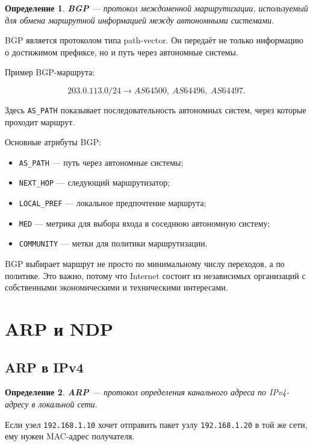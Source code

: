 \documentclass[12pt,a4paper]{article}
\newtheorem{definition}{Определение}
\begin{document}
\begin{definition}
\textbf{BGP} --- протокол междоменной маршрутизации, используемый для обмена маршрутной информацией между автономными системами.
\end{definition}

BGP является протоколом типа path-vector. Он передаёт не только информацию о достижимом префиксе, но и путь через автономные системы.

Пример BGP-маршрута:

\[
203.0.113.0/24 \rightarrow AS64500,\ AS64496,\ AS64497.
\]

Здесь \texttt{AS\_PATH} показывает последовательность автономных систем, через которые проходит маршрут.

Основные атрибуты BGP:

\begin{itemize}
    \item \texttt{AS\_PATH} --- путь через автономные системы;
    \item \texttt{NEXT\_HOP} --- следующий маршрутизатор;
    \item \texttt{LOCAL\_PREF} --- локальное предпочтение маршрута;
    \item \texttt{MED} --- метрика для выбора входа в соседнюю автономную систему;
    \item \texttt{COMMUNITY} --- метки для политики маршрутизации.
\end{itemize}

BGP выбирает маршрут не просто по минимальному числу переходов, а по политике. Это важно, потому что Internet состоит из независимых организаций с собственными экономическими и техническими интересами.

\section{ARP и NDP}

\subsection{ARP в IPv4}

\begin{definition}
\textbf{ARP} --- протокол определения канального адреса по IPv4-адресу в локальной сети.
\end{definition}

Если узел \texttt{192.168.1.10} хочет отправить пакет узлу \texttt{192.168.1.20} в той же сети, ему нужен MAC-адрес получателя.
\end{document}
